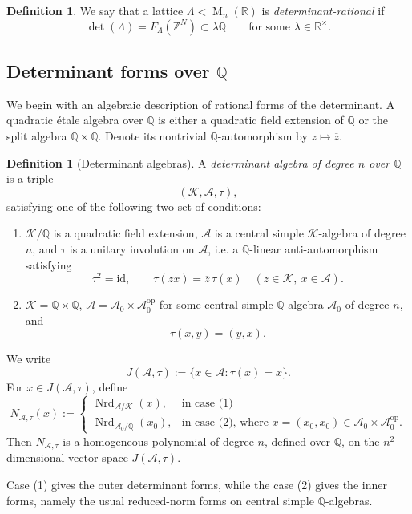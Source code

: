 \documentclass[reqno,11pt]{amsart}
\numberwithin{equation}{section}
\theoremstyle{definition}
\newtheorem{definition}[theorem]{Definition}
\theoremstyle{remark}
\newcommand{\op}{\operatorname}
\newcommand{\br}{\mathbb R}
\newcommand{\M}{\op{M}}
\begin{document}
\begin{definition}
    We say that a lattice $\Lambda<\M_n(\br)$ is
\emph{determinant-rational} if
$$ \det(\Lambda)=F_\Lambda(\mathbb Z^N)
    \subset \lambda\mathbb Q
    \qquad
    \text{for some }\lambda\in\mathbb R^\times .
$$
\end{definition}
\subsection{Determinant forms over $\mathbb Q$}

We begin with an algebraic description of rational forms of the determinant.
A quadratic \'etale algebra over $\mathbb Q$ is either a quadratic field
extension of $\mathbb Q$ or the split algebra
$\mathbb Q\times\mathbb Q$. Denote its nontrivial
$\mathbb Q$-automorphism by $z\mapsto \overline z$.
\begin{definition}[Determinant algebras]
\label{def:determinant-algebra}
A \emph{determinant algebra of degree $n$ over $\mathbb Q$} is a triple
$$
    (\mathscr{K},\mathscr{A},\tau),
$$
satisfying one of the following two set of conditions:

\begin{enumerate}
\item $\mathscr{K}/\mathbb Q$ is a quadratic field extension, $\mathscr{A}$ is a central
simple $\mathscr{K}$-algebra of degree $n$, and $\tau$ is a unitary involution on
$\mathscr{A}$, i.e. a $\mathbb Q$-linear anti-automorphism satisfying
$$
    \tau^2=\mathrm{id},
    \qquad
    \tau(zx)=\overline z\,\tau(x)
    \quad (z\in \mathscr{K},\ x\in \mathscr{A}).
$$

\item $\mathscr{K}=\mathbb Q\times\mathbb Q$, $\mathscr{A}=\mathscr{A}_0\times \mathscr{A}_0^{\mathrm{op}}$ for
some central simple $\mathbb Q$-algebra $\mathscr{A}_0$ of degree $n$, and
$$
    \tau(x,y)=(y,x).
$$
\end{enumerate}


We write
$$
    J(\mathscr{A},\tau):=\{x\in \mathscr{A}:\tau(x)=x\}.
$$
 For $x\in J(\mathscr{A},\tau)$, define
$$
    N_{\mathscr{A},\tau}(x):=
    \begin{cases}
    \operatorname{Nrd}_{\mathscr{A}/\mathscr{K}}(x),&
    \text{in case (1)} \\
    \operatorname{Nrd}_{\mathscr{A}_0/\mathbb Q}(x_0),&
    \text{in case (2), where }x=(x_0,x_0)\in
    \mathscr{A}_0\times \mathscr{A}_0^{\mathrm{op}}.
    \end{cases}
$$
Then $N_{\mathscr{A},\tau}$ is a homogeneous polynomial of degree $n$, defined
over $\mathbb Q$, on the $n^2$-dimensional vector space $J(\mathscr{A},\tau)$.
\end{definition}
Case (1) gives the outer determinant forms, while the case (2) gives the inner forms, namely the usual
reduced-norm forms on central simple $\mathbb Q$-algebras.
\end{document}
